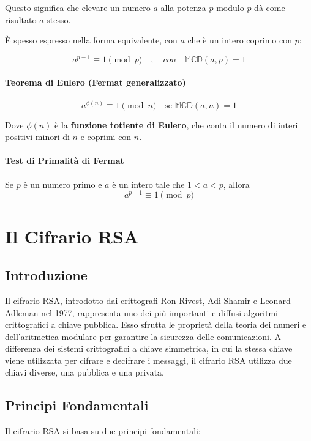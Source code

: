 \documentclass[a4paper,12pt]{report}
\begin{document}
Questo significa che elevare un numero $a$ alla potenza $p$ modulo $p$ dà come risultato $a$ stesso.

È spesso espresso nella forma equivalente, con \(a\) che è un intero coprimo con \(p\):

\[a^{p-1} \equiv 1 \pmod{p}\quad,\quad con\quad \mathbb{MCD}(a,p)=1\]

\subsubsection*{Teorema di Eulero (Fermat generalizzato)}

$$a^{\phi(n)} \equiv 1 \pmod{n} \quad \text{se } \mathbb{MCD}(a,n) = 1$$

Dove $\phi(n)$ è la \textbf{funzione totiente di Eulero}, che conta il numero di interi positivi minori di $n$ e coprimi con $n$.

\subsubsection*{Test di Primalità di Fermat} \label{sec:fermat}
Se $p$ è un numero primo e $a$ è un intero tale che $1 < a < p$, allora
\[a^{p-1} \equiv 1 \pmod{p}\]


%
%
%
%
%
%
%
%
%
%
%
%
%
%
%
%
%
%
%
%
%
%
%
%
%
%
%
%
%
%
%
%
%
%
%
%
%
%
%
%
%
\chapter{Il Cifrario RSA}

\section{Introduzione}
Il cifrario RSA, introdotto dai crittografi Ron Rivest, Adi Shamir e Leonard Adleman nel 1977, rappresenta uno dei più importanti e diffusi algoritmi crittografici a chiave pubblica. 
Esso sfrutta le proprietà della teoria dei numeri e dell'aritmetica modulare per garantire la sicurezza delle comunicazioni. 
A differenza dei sistemi crittografici a chiave simmetrica, in cui la stessa chiave viene utilizzata per cifrare e decifrare i messaggi, il cifrario RSA utilizza due chiavi diverse, una pubblica e una privata.

\section{Principi Fondamentali}
Il cifrario RSA si basa su due principi fondamentali:
\end{document}

